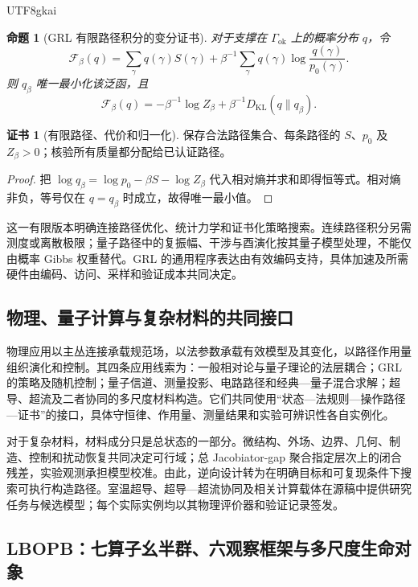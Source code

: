 \documentclass[11pt,a4paper]{article}
\theoremstyle{plain}
\newtheorem{proposition}[theorem]{命题}
\theoremstyle{definition}
\newtheorem*{certificate}{证书}
\theoremstyle{remark}
\begin{document}
\begin{CJK*}{UTF8}{gkai}
\begin{proposition}[GRL 有限路径积分的变分证书]
\label{fa:prop-gibbs}
对于支撑在 $\Gamma_{\mathrm{ok}}$ 上的概率分布 $q$，令
\[
 \mathcal F_\beta(q)=\sum_\gamma q(\gamma)S(\gamma)
 +\beta^{-1}\sum_\gamma q(\gamma)
 \log\frac{q(\gamma)}{p_0(\gamma)}.
\]
则 $q_\beta$ 唯一最小化该泛函，且
\[
 \mathcal F_\beta(q)=-\beta^{-1}\log Z_\beta
 +\beta^{-1}D_{\mathrm{KL}}(q\|q_\beta).
\]
\end{proposition}
\begin{certificate}[有限路径、代价和归一化]
保存合法路径集合、每条路径的 $S$、$p_0$ 及 $Z_\beta>0$；核验所有质量都分配给已认证路径。
\end{certificate}
\begin{proof}
把 $\log q_\beta=\log p_0-\beta S-\log Z_\beta$ 代入相对熵并求和即得恒等式。相对熵非负，等号仅在 $q=q_\beta$ 时成立，故得唯一最小值。
\end{proof}

这一有限版本明确连接路径优化、统计力学和证书化策略搜索。连续路径积分另需测度或离散极限；量子路径中的复振幅、干涉与酉演化按其量子模型处理，不能仅由概率 Gibbs 权重替代。GRL 的通用程序表达由有效编码支持，具体加速及所需硬件由编码、访问、采样和验证成本共同决定。\cite{S02,S16}

\subsection{物理、量子计算与复杂材料的共同接口}

物理应用以主丛连接承载规范场，以法参数承载有效模型及其变化，以路径作用量组织演化和控制。其四条应用线索为：一般相对论与量子理论的法层耦合；GRL 的策略及随机控制；量子信道、测量投影、电路路径和经典—量子混合求解；超导、超流及二者协同的多尺度材料构造。它们共同使用“状态—法规则—操作路径—证书”的接口，具体守恒律、作用量、测量结果和实验可辨识性各自实例化。\cite{S02}

对于复杂材料，材料成分只是总状态的一部分。微结构、外场、边界、几何、制造、控制和扰动恢复共同决定可行域；总 Jacobiator-gap 聚合指定层次上的闭合残差，实验观测承担模型校准。由此，逆向设计转为在明确目标和可复现条件下搜索可执行构造路径。室温超导、超导—超流协同及相关计算载体在源稿中提供研究任务与候选模型；每个实际实例均以其物理评价器和验证记录签发。

\subsection{LBOPB：七算子幺半群、六观察框架与多尺度生命对象}


\end{CJK*}
\end{document}
